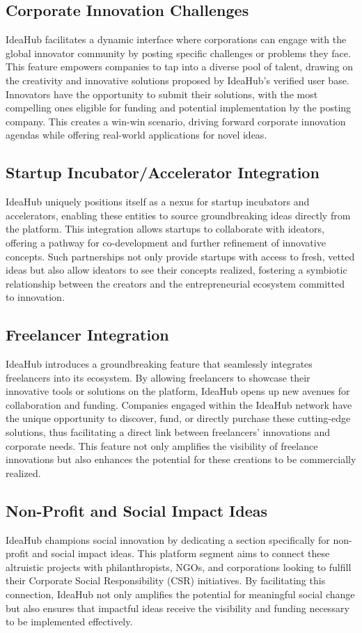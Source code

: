 \documentclass{article}
\begin{document}
	
	\subsection{Corporate Innovation Challenges}
	IdeaHub facilitates a dynamic interface where corporations can engage with the global innovator community by posting specific challenges or problems they face. This feature empowers companies to tap into a diverse pool of talent, drawing on the creativity and innovative solutions proposed by IdeaHub's verified user base. Innovators have the opportunity to submit their solutions, with the most compelling ones eligible for funding and potential implementation by the posting company. This creates a win-win scenario, driving forward corporate innovation agendas while offering real-world applications for novel ideas.
	
	
	\subsection{Startup Incubator/Accelerator Integration}
	IdeaHub uniquely positions itself as a nexus for startup incubators and accelerators, enabling these entities to source groundbreaking ideas directly from the platform. This integration allows startups to collaborate with ideators, offering a pathway for co-development and further refinement of innovative concepts. Such partnerships not only provide startups with access to fresh, vetted ideas but also allow ideators to see their concepts realized, fostering a symbiotic relationship between the creators and the entrepreneurial ecosystem committed to innovation.
	
	
	\subsection{Freelancer Integration}
	IdeaHub introduces a groundbreaking feature that seamlessly integrates freelancers into its ecosystem. By allowing freelancers to showcase their innovative tools or solutions on the platform, IdeaHub opens up new avenues for collaboration and funding. Companies engaged within the IdeaHub network have the unique opportunity to discover, fund, or directly purchase these cutting-edge solutions, thus facilitating a direct link between freelancers' innovations and corporate needs. This feature not only amplifies the visibility of freelance innovations but also enhances the potential for these creations to be commercially realized.
	
	
	\subsection{Non-Profit and Social Impact Ideas}
	IdeaHub champions social innovation by dedicating a section specifically for non-profit and social impact ideas. This platform segment aims to connect these altruistic projects with philanthropists, NGOs, and corporations looking to fulfill their Corporate Social Responsibility (CSR) initiatives. By facilitating this connection, IdeaHub not only amplifies the potential for meaningful social change but also ensures that impactful ideas receive the visibility and funding necessary to be implemented effectively.
	
\end{document}
